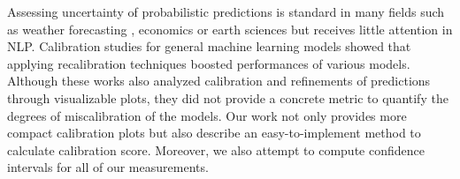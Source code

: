 Assessing uncertainty of probabilistic predictions is standard in many fields such as weather forecasting \citep{murphy1993good}, economics \citep{canova1994statistical, cooley1997calibrated} or earth sciences \citep{oreskes1994verification} but receives little attention in NLP. Calibration studies for general machine learning models \cite{niculescu2005predicting, caruana2006empirical} showed that applying recalibration techniques boosted performances of various models. Although these works also analyzed calibration and refinements of predictions through visualizable plots, they did not provide a concrete metric to quantify the degrees of miscalibration of the models. Our work not only provides more compact calibration plots but also describe an easy-to-implement method to calculate calibration score. Moreover, we also attempt to compute confidence intervals for all of our measurements.  




